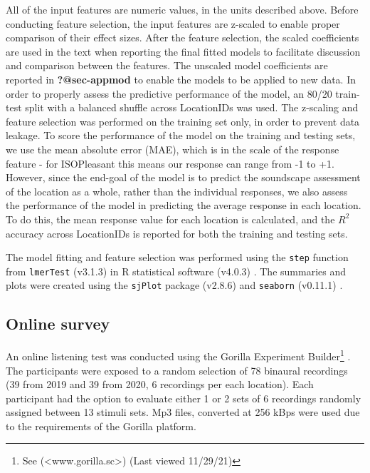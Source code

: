 \documentclass[
  authoryear,
  preprint,
  3p,
  onecolumn]{elsarticle}
\begin{document}
All of the input features are numeric values, in the units described
above. Before conducting feature selection, the input features are
z-scaled to enable proper comparison of their effect sizes. After the
feature selection, the scaled coefficients are used in the text when
reporting the final fitted models to facilitate discussion and
comparison between the features. The unscaled model coefficients are
reported in \textbf{?@sec-appmod} to enable the models to be applied to
new data. In order to properly assess the predictive performance of the
model, an 80/20 train-test split with a balanced shuffle across
LocationIDs was used. The z-scaling and feature selection was performed
on the training set only, in order to prevent data leakage. To score the
performance of the model on the training and testing sets, we use the
mean absolute error (MAE), which is in the scale of the response feature
- for ISOPleasant this means our response can range from -1 to +1.
However, since the end-goal of the model is to predict the soundscape
assessment of the location as a whole, rather than the individual
responses, we also assess the performance of the model in predicting the
average response in each location. To do this, the mean response value
for each location is calculated, and the \(R^2\) accuracy across
LocationIDs is reported for both the training and testing sets.

The model fitting and feature selection was performed using the
\texttt{step} function from \texttt{lmerTest} (v3.1.3)
\citep{Kuznetsova2017lmerTest} in R statistical software (v4.0.3)
\citep{RCT2018R}. The summaries and plots were created using the
\texttt{sjPlot} package (v2.8.6) \citep{Luedecke2021sjPlot} and
\texttt{seaborn} (v0.11.1) \citep{Waskom2021seaborn}.

\subsection{Online survey}\label{online-survey}

An online listening test was conducted using the Gorilla Experiment
Builder\footnote{See (\textless www.gorilla.sc\textgreater) (Last viewed
  11/29/21)} \citep{AnwylIrvine2019Gorilla}. The participants were
exposed to a random selection of 78 binaural recordings (39 from 2019
and 39 from 2020, 6 recordings per each location). Each participant had
the option to evaluate either 1 or 2 sets of 6 recordings randomly
assigned between 13 stimuli sets. Mp3 files, converted at 256 kBps were
used due to the requirements of the Gorilla platform.
\end{document}
